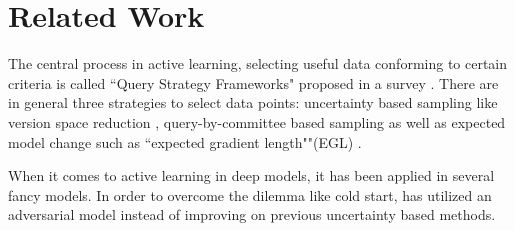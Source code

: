\section{Related Work}
\label{sec:related}
The central process in active learning, selecting useful data conforming to certain criteria is called ``Query Strategy Frameworks" proposed in a survey  \cite{settles2009active}. There are in general three strategies to select data points: uncertainty based sampling like version space reduction \cite{cohn1994improving}, query-by-committee \cite{seung1992query} based sampling as well as expected model change such as ``expected gradient length""(EGL) \cite{settles2009active}. 

When it comes to active learning in deep models, it has been applied in several fancy models. In order to overcome the dilemma like cold start,  \cite{deng2018adversarial} has utilized an adversarial model instead of improving on previous uncertainty based methods.